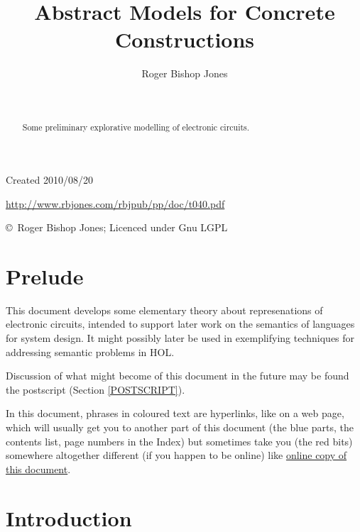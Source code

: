 \documentclass[11pt]{article}
\title{Abstract Models for Concrete Constructions}
\author{Roger Bishop Jones}
\date{\ }
\begin{document}
\begin{titlepage}
\maketitle
\begin{abstract}
Some preliminary explorative modelling of electronic circuits.
\end{abstract}
\vfill

\begin{centering}
{\footnotesize

Created 2010/08/20



\href{http://www.rbjones.com/rbjpub/pp/doc/t040.pdf}
{http://www.rbjones.com/rbjpub/pp/doc/t040.pdf}

\copyright\ Roger Bishop Jones; Licenced under Gnu LGPL

}%
\end{centering}

\thispagestyle{empty}
\end{titlepage}

\newpage
\addtocounter{page}{1}
{\parskip=0pt\tableofcontents}

\section{Prelude}

This document develops some elementary theory about represenations of electronic circuits, intended to support later work on the semantics of languages for system design.
It might possibly later be used in exemplifying techniques for addressing semantic problems in HOL.

Discussion of what might become of this document in the future may be found the postscript (Section \ref{POSTSCRIPT}).

In this document, phrases in coloured text are hyperlinks, like on a web page, which will usually get you to another part of this document (the blue parts, the contents list, page numbers in the Index) but sometimes take you (the red bits) somewhere altogether different (if you happen to be online) like \href{http://rbjones.com/rbjpub/pp/doc/t040.pdf}{online copy of this document}.

\cite{rbjt000}

\section{Introduction}
\end{document}
